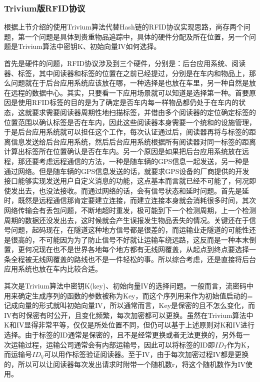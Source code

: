 \subsubsection{Trivium版RFID协议}

根据上节介绍的使用Trivium算法代替Hash链的RFID协议实现思路，尚存两个问题，第一个问题是具体到贵重物品追踪中，具体的硬件分配及所在位置，另一个问题是Trivium算法中密钥K、初始向量IV如何选择。

首先是硬件的问题，RFID协议涉及到三个硬件，分别是：后台应用系统、阅读器、标签，其中阅读器和标签的位置在之前已经提过，分别是在车内和物品上，那么问题就在于后台应用系统应该放在哪，一种选择是也放在车里，另一种自然是放在远程的数据中心。其实，只要看一下应用场景就可以知道是选择第一种。首要原因是使用RFID标签的目的是为了确定是否车内每一样物品都仍处于在车内的状态，这就要求需要阅读器周期性地扫描标签，并借由多个阅读器的定位确定标签的位置范围以确认标签是否在车内，因此这些阅读器本身需要一个统和的设施管理，于是后台应用系统就可以担任这个工作，每次认证通过后，阅读器再将与标签的距离信息发送给后台应用系统，然后后台应用系统根据所有阅读器对同一标签的距离计算出标签所在位置确认是否在车内。另一个原因是如果把后台应用系统放在远程，那还要考虑远程通信的方法，一种是随车辆的GPS信息一起发送，另一种是通过网络。但是随车辆的GPS信息发送的话，就要求GPS设备的厂商提供的开发接口能够实现发送用户自定义消息的功能，这点基本而言就已经不可能了，何况即使发出去，也没法接收。而通过网络的话，会有信号状态和延时问题。首先是延时，既然是远程通信那肯定要建立连接，而建立连接本身就会消耗很多时间，其次网络传输会有丢包问题，不断地超时重发，极可能到下一个检测周期，上一个检测周期的数据还没发出去，这时候就会产生误报发生物品丢失的情况。关键还在于信号问题，起码现在，在隧道这种地方信号都是很差的，而运输业走隧道的可能性还是很高的，不可能因为为了防止信号不好就让运输车绕远路，这反而是一种本末倒置，更何况现在也不是世界各地每个地方都有无线网覆盖，从起点到终点要选择一条全程被无线网覆盖的路线也不是一件轻松的事。所以综合考虑，还是直接将后台应用系统也放在车内比较合适。

其次是Trivium算法中密钥K(key)、初始向量IV的选择问题。一般而言，流密码中用来确定生成序列的函数的参数被称为Key，而这个序列用来作为初始值启动的=记成向量的形式就叫初始向量IV，所以通常而言，Key是保密的且不怎么变化，而IV有时保密有时公开，且变化频繁，每次加密都可以更换。虽然在Trivium算法中K和IV显得非常平等，仅仅是所处位置不同，但仍可以基于上述原则对K和IV进行选择。由于标签的ID通常是保密的，且不是经常更换或者无法更换的，另外每一次运输过程，运输公司通常会有内部运输号，因此可以将标签的ID即$ID_{T}$作为K，而运输号$ID_{V}$可以用作标签验证阅读器。至于IV，由于每次加密过程IV都是更换的，所以可以让阅读器每次发出请求时附带一个随机数r，将这个随机数作为IV使用。

